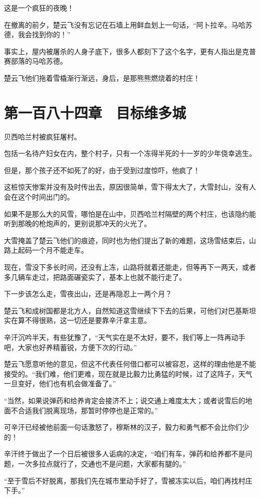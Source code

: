 这是一个疯狂的夜晚！

在撤离的前夕，楚云飞没有忘记在石墙上用鲜血划上一句话，“阿卜拉辛。马哈苏德，我会找到你的！”

事实上，屋内被屠杀的人身子底下，很多人都刻下了这个名字，更有人指出是克普赛部落的马哈苏德。

楚云飞他们拖着雪橇渐行渐远，身后，是那熊熊燃烧着的村庄！

\section{第一百八十四章　目标维多城}

贝西哈兰村被疯狂屠村。

包括一名待产妇女在内，整个村子，只有一个冻得半死的十一岁的少年侥幸逃生。

但是，那个孩子还不如死了的好，由于受到过度惊吓，他疯了！

这桩惊天惨案并没有及时传出去，原因很简单，雪下得太大了，大雪封山，没有人会在这个时间出门的。

如果不是那么大的风雪，哪怕是在山中，贝西哈兰村隔壁的两个村庄，也该隐约能听到那晚的枪炮声的，更别说那冲天的火光了。

大雪掩盖了楚云飞他们的痕迹，同时也为他们提出了新的难题，这场雪结束后，山路上起码一个月不能走车。

现在，雪没下多长时间，还没有上冻，山路将就着还能走，但等再下一两天，或者多几辆车走过，把路面碾瓷实了，基本上也就不能行走了。

下一步该怎么走，雪夜出山，还是再隐忍上一两个月？

楚云飞和成树国都是北方人，自然知道这雪继续下下去的后果，可他们对巴基斯坦实在算不得很熟，这一切还是要靠辛汗拿主意。

辛汗沉吟半天，有些犹豫了，“天气实在是不太好，要不，我们等上一阵再动手吧，大家也好养精蓄锐，方便下次的行动。”

楚云飞愿意听他的意见，但这不代表任何借口都可以被容忍，这样的理由他是不能接受的。“我们难，他们更难，现在就是比毅力比勇猛的时候，过了这阵子，天气一旦变好，他们也有机会做准备了。”

“当然，如果说弹药和给养肯定会接济不上；说交通上难度太大；或者说雪后的地面不合适我们脱离现场，那暂时停停也是正常的。”

可辛汗已经被他前面一句话激怒了，穆斯林的汉子，毅力和勇气都不会比你们少的！

辛汗终于做出了一个日后被很多人诟病的决定，“咱们有车，弹药和给养都不是问题，一次多拉点就行了，交通也不是问题，大家都有腿的。”

“至于雪后不好脱离，那我们先在城市里动手好了，雪被冻实以后，咱们再找村庄下手。”

